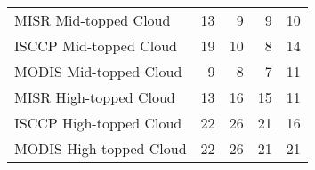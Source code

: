 \begin{tabular}{lrrrr}
   MISR Mid-topped Cloud &                       13 &                        9 &                        9 &                       10 \\
  ISCCP Mid-topped Cloud &                       19 &                       10 &                        8 &                       14 \\
  MODIS Mid-topped Cloud &                        9 &                        8 &                        7 &                       11 \\
  MISR High-topped Cloud &                       13 &                       16 &                       15 &                       11 \\
 ISCCP High-topped Cloud &                       22 &                       26 &                       21 &                       16 \\
 MODIS High-topped Cloud &                       22 &                       26 &                       21 &                       21 \\ \hline
\end{tabular}
